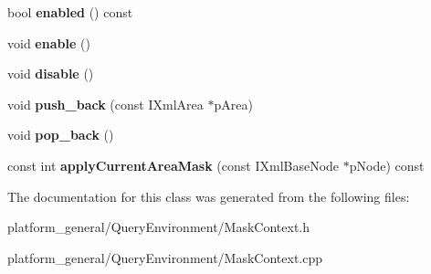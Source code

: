 \begin{DoxyCompactItemize}
\item 
\hypertarget{classgeneral__server_1_1MaskContext_ae6281534707d0fe97f3a9b17948825ff}{bool {\bfseries enabled} () const }\label{classgeneral__server_1_1MaskContext_ae6281534707d0fe97f3a9b17948825ff}

\item 
\hypertarget{classgeneral__server_1_1MaskContext_a156a30e791a80e0d5e0f090a5d52803b}{void {\bfseries enable} ()}\label{classgeneral__server_1_1MaskContext_a156a30e791a80e0d5e0f090a5d52803b}

\item 
\hypertarget{classgeneral__server_1_1MaskContext_a6f3b474f1c3e3e2604ef78e2819de1ab}{void {\bfseries disable} ()}\label{classgeneral__server_1_1MaskContext_a6f3b474f1c3e3e2604ef78e2819de1ab}

\item 
\hypertarget{classgeneral__server_1_1MaskContext_abce571cfdd2c15b2b5ef8a1fa0acdccf}{void {\bfseries push\-\_\-back} (const \-I\-Xml\-Area $\ast$p\-Area)}\label{classgeneral__server_1_1MaskContext_abce571cfdd2c15b2b5ef8a1fa0acdccf}

\item 
\hypertarget{classgeneral__server_1_1MaskContext_ae6dd2412edc5f38ecf5e18d60b866375}{void {\bfseries pop\-\_\-back} ()}\label{classgeneral__server_1_1MaskContext_ae6dd2412edc5f38ecf5e18d60b866375}

\item 
\hypertarget{classgeneral__server_1_1MaskContext_af2d58b79d7cbdeab2389bdafacfee5f9}{const int {\bfseries apply\-Current\-Area\-Mask} (const \-I\-Xml\-Base\-Node $\ast$p\-Node) const }\label{classgeneral__server_1_1MaskContext_af2d58b79d7cbdeab2389bdafacfee5f9}

\end{DoxyCompactItemize}


\-The documentation for this class was generated from the following files\-:\begin{DoxyCompactItemize}
\item 
platform\-\_\-general/\-Query\-Environment/\-Mask\-Context.\-h\item 
platform\-\_\-general/\-Query\-Environment/\-Mask\-Context.\-cpp\end{DoxyCompactItemize}
